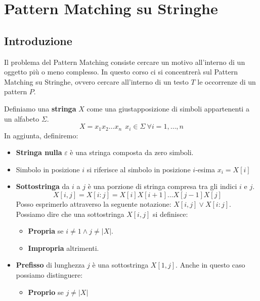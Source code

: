\chapter{Pattern Matching su Stringhe}
\section{Introduzione}
Il problema del Pattern Matching consiste cercare un motivo all'interno di un oggetto
più o meno complesso. In questo corso ci si concentrerà sul Pattern Matching su
Stringhe, ovvero cercare all'interno di un testo $T$ le occorrenze di un pattern $P$.
\begin{definizione}
    Definiamo una \textbf{stringa} $X$ come una giustapposizione di simboli
    appartenenti a un alfabeto $\Sigma$.
    \begin{equation}
        X=x_1x_2\dots x_n \ \ x_i \in \Sigma \ \forall i = 1, \dots, n
    \end{equation}
    In aggiunta, definiremo:
    \begin{itemize}
        \item \textbf{Stringa nulla} $\varepsilon$ è una stringa composta da
              zero simboli.
        \item Simbolo in posizione $i$ si riferisce al simbolo in posizione
              $i$-esima $x_i = X[i]$
        \item \textbf{Sottostringa} da $i$ a $j$ è una porzione di stringa
              compresa tra gli indici $i$ e $j$.
              \begin{equation}
                  X[i, j] = X[i:j] = X[i]X[i+1]\dots X[j - 1]X[j]
              \end{equation}
              Posso esprimerlo attraverso la seguente notazione: $X[i, j] \lor X[i:j]$.
              Possiamo dire che una sottostringa $X[i, j]$ si definisce:
              \begin{itemize}
                  \item \textbf{Propria} se $i \neq 1 \land j \neq |X|$.
                  \item \textbf{Impropria} altrimenti.
              \end{itemize}
        \item \textbf{Prefisso} di lunghezza $j$ è una sottostringa $X[1, j]$.
              Anche in questo caso possiamo distinguere:
              \begin{itemize}
                  \item \textbf{Proprio} se $j \neq |X|$

\end{itemize}
\end{itemize}
\end{definizione}
